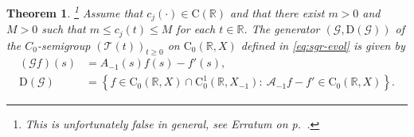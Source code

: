 \documentclass[a4paper,oneside,10pt]{amsart}
\newtheorem{theorem}{Theorem}[section]
\theoremstyle{definition}
\numberwithin{equation}{section}
\def\dom{\mathrm{D}}
\def\RR{\mathbb{R}}
\begin{document}
\begin{theorem}\label{prop:DomEvoSemi}\footnote{This is unfortunately false in general, see Erratum on p.~\pageref{erratum}.}
Assume that $c_j(\cdot)\in\mathrm{C}(\RR)$ and that there exist {$m>0$ and $M>0$} such that $m\leq c_j(t)\leq M$ for each $t\in\RR$.
The generator $(\mathcal{G},\dom(\mathcal{G}))$ of the $C_0$-semigroup $(\mathcal{T}(t))_{t\geq0}$ on $\mathrm{C}_0(\RR,X)$ defined in \eqref{eq:sgr-evol} is given by
\begin{equation}\label{eqn:DomEvoSemi}
\begin{aligned}
(\mathcal{G}f)(s)&=A_{-1}(s)f(s)-f'(s),\\
\dom(\mathcal{G})&=\left\{f\in\mathrm{C}_0(\RR,X)\cap\mathrm{C}_0^1(\RR,X_{-1}):\ {\mathcal{A}_{-1}} f-f'\in\mathrm{C}_0(\RR,X)\right\}.
\end{aligned}
\end{equation}
\end{theorem} 
\end{document}
